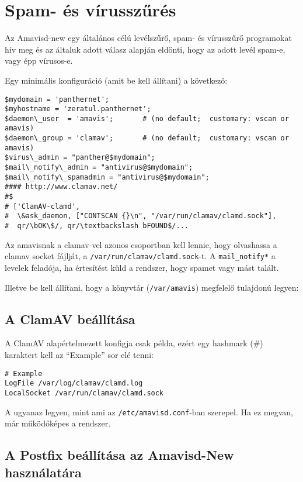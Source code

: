 \chapter{Spam- és vírusszűrés}\label{chap:spams-viruses}
Az Amavisd-new egy általános célú levélszűrő, spam- és vírusszűrő programokat hív meg és az általuk adott válasz
alapján eldönti, hogy az adott levél spam-e, vagy épp vírusos-e.

Egy minimális konfiguráció (amit be kell állítani) a következő:

\begin{Verbatim}[frame=single,label=amavisd.conf részlet]
$mydomain = 'panthernet';
$myhostname = 'zeratul.panthernet';
$daemon\_user  = 'amavis';       # (no default;  customary: vscan or amavis)
$daemon\_group = 'clamav';       # (no default;  customary: vscan or amavis)
$virus\_admin = "panther@$mydomain";
$mail\_notify\_admin = "antivirus@$mydomain";
$mail\_notify\_spamadmin = "antivirus@$mydomain";
#### http://www.clamav.net/ 
#$
# ['ClamAV-clamd',
#  \&ask_daemon, ["CONTSCAN {}\n", "/var/run/clamav/clamd.sock"],
#  qr/\bOK\$/, qr/\textbackslash bFOUND$/...
\end{Verbatim}

Az amavisnak a clamav-vel azonos csoportban kell lennie, hogy olvashassa a clamav socket fájlját, a
\texttt{/var/run/clamav/clamd.sock}-t.
A \texttt{mail\_notify*} a levelek feladója, ha értesítést küld a rendszer, hogy spamet vagy mást talált.


Illetve be kell állítani, hogy a könyvtár (\texttt{/var/amavis}) megfelelő tulajdonú legyen:


\section{A ClamAV beállítása}
A ClamAV alapértelmezett konfigja csak példa, ezért egy hashmark (\#) karaktert kell az ``Example'' sor elé tenni:

\begin{Verbatim}[frame=single,label=clamd.conf részlet]
# Example
LogFile /var/log/clamav/clamd.log
LocalSocket /var/run/clamav/clamd.sock
\end{Verbatim}


A  ugyanaz legyen, mint ami az \texttt{/etc/amavisd.conf}-ban szerepel. Ha ez megvan, már
működőképes a rendszer.

\section{A Postfix beállítása az Amavisd-New használatára}


